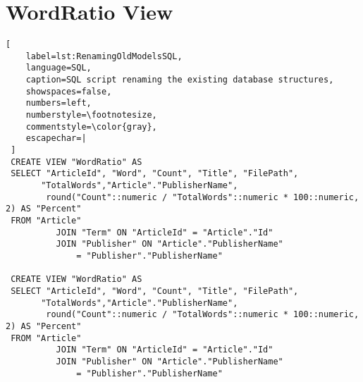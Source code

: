 \chapter{WordRatio View}\label{Appendix_WordRatioOld}
\begin{lstlisting}[
    label=lst:RenamingOldModelsSQL,
    language=SQL,
    caption=SQL script renaming the existing database structures,
    showspaces=false,
    numbers=left,
    numberstyle=\footnotesize,
    commentstyle=\color{gray},
    escapechar=|
 ]
 CREATE VIEW "WordRatio" AS
 SELECT "ArticleId", "Word", "Count", "Title", "FilePath", 
       "TotalWords","Article"."PublisherName",
        round("Count"::numeric / "TotalWords"::numeric * 100::numeric, 2) AS "Percent"
 FROM "Article"
          JOIN "Term" ON "ArticleId" = "Article"."Id"
          JOIN "Publisher" ON "Article"."PublisherName" 
              = "Publisher"."PublisherName"
 
 CREATE VIEW "WordRatio" AS
 SELECT "ArticleId", "Word", "Count", "Title", "FilePath", 
       "TotalWords","Article"."PublisherName",
        round("Count"::numeric / "TotalWords"::numeric * 100::numeric, 2) AS "Percent"
 FROM "Article"
          JOIN "Term" ON "ArticleId" = "Article"."Id"
          JOIN "Publisher" ON "Article"."PublisherName" 
              = "Publisher"."PublisherName"
\end{lstlisting}
